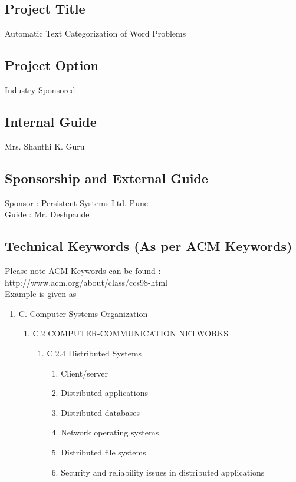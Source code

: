 \documentclass[12pt,a4paper]{article}
\begin{document}
\subsection{Project Title}
 Automatic Text Categorization of Word Problems

\subsection{ Project Option }
Industry Sponsored

\subsection{Internal Guide}
Mrs. Shanthi K. Guru

\subsection{ Sponsorship and External Guide} 
Sponsor : Persistent Systems Ltd. Pune\\
Guide 	: Mr. Deshpande 


\subsection{Technical Keywords (As per ACM Keywords)}
Please note ACM Keywords can be found : http://www.acm.org/about/class/ccs98-html \\
Example is given as
\begin{enumerate}
	\item C. Computer Systems Organization 
	\begin{enumerate}
		\item C.2 COMPUTER-COMMUNICATION NETWORKS 
		\begin{enumerate}
			\item C.2.4 Distributed Systems 
			\begin{enumerate}
				\item  Client/server 
\item Distributed applications
\item Distributed databases
\item Network operating systems 
\item Distributed file systems
\item Security and reliability issues in distributed applications
	 		\end{enumerate} 
		\end{enumerate} 
	  

	
	\end{enumerate}
\end{enumerate}
\end{document}
